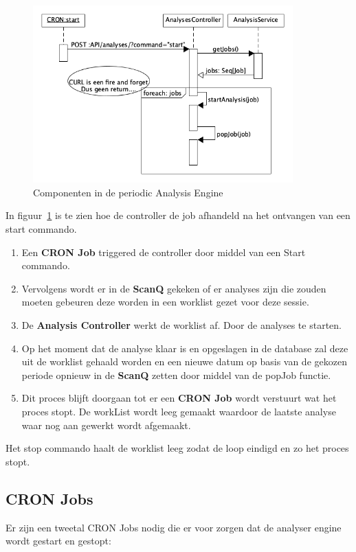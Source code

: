 \begin{figure}[bth]
    \myfloatalign
    \includegraphics[width=10cm]{gfx/umlet/exports/PAE-jobssequence}
    \caption{Componenten in de periodic Analysis Engine}
    \label{fig:jobSeq}
\end{figure}

In figuur~\ref{fig:jobSeq} is te zien hoe de controller de job afhandeld na het ontvangen van een start commando.
\begin{enumerate}
    \item Een \textbf{CRON Job} triggered de controller door middel van een Start commando.
    \item Vervolgens wordt er in de \textbf{ScanQ} gekeken of er analyses zijn die zouden moeten gebeuren deze worden in een worklist gezet voor deze sessie.
    \item De \textbf{Analysis Controller} werkt de worklist af. Door de analyses te starten.
    \item Op het moment dat de analyse klaar is en opgeslagen in de database zal deze uit de worklist gehaald worden en een nieuwe datum op basis van de gekozen periode opnieuw in de \textbf{ScanQ} zetten door middel van de popJob functie.
    \item Dit proces blijft doorgaan tot er een \textbf{CRON Job} wordt verstuurt wat het proces stopt. De workList wordt leeg gemaakt waardoor de laatste analyse waar nog aan gewerkt wordt afgemaakt.
\end{enumerate}

Het stop commando haalt de worklist leeg zodat de loop eindigd en zo het proces stopt.

\subsection{CRON Jobs}\label{subsec:cron-jobs}
Er zijn een tweetal CRON Jobs nodig die er voor zorgen dat de analyser engine wordt gestart en gestopt:

